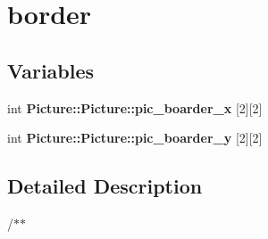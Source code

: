 \hypertarget{group___picure}{}\section{border}
\label{group___picure}
\subsection*{Variables}
\begin{DoxyCompactItemize}
\item 
\mbox{\label{group___picure_ga62b9b579f0edd39a986aa614a6d51536}} 
int {\bfseries Picture\+::\+Picture\+::pic\+\_\+boarder\+\_\+x} \mbox{[}2\mbox{]}\mbox{[}2\mbox{]}
\item 
\mbox{\label{group___picure_gaef6baa8934f351d974d75a43834c7738}} 
int {\bfseries Picture\+::\+Picture\+::pic\+\_\+boarder\+\_\+y} \mbox{[}2\mbox{]}\mbox{[}2\mbox{]}
\end{DoxyCompactItemize}


\subsection{Detailed Description}

\begin{DoxyItemize}
\item /$\ast$$\ast$ 
\end{DoxyItemize}